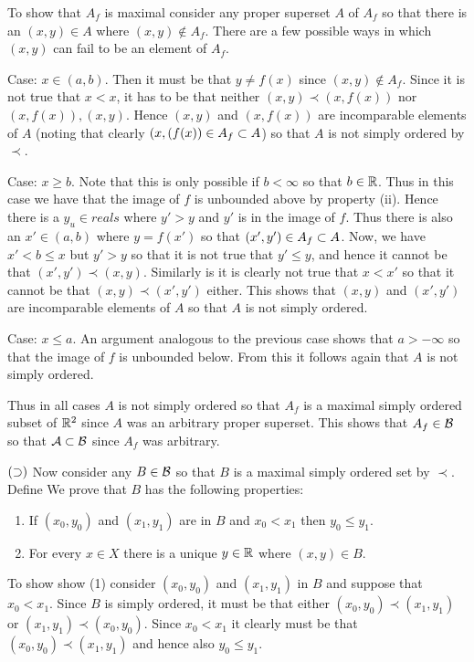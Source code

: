 {{    To show that $A_f$ is maximal consider any proper superset $A$ of $A_f$ so that there is an $(x,y) \in A$ where $(x,y) \notin A_f$.
    There are a few possible ways in which $(x,y)$ can fail to be an element of $A_f$.

    Case: $x \in (a,b)$.
    Then it must be that $y \neq f(x)$ since $(x,y) \notin A_f$.
    Since it is not true that $x < x$, it has to be that neither $(x,y) \prec (x,f(x))$ nor $(x,f(x)), (x,y)$.
    Hence $(x,y)$ and $(x,f(x))$ are incomparable elements of $A$ (noting that clearly $(x,(f(x)) \in A_f \ss A$) so that $A$ is not simply ordered by $\prec$.

    Case: $x \geq b$.
    Note that this is only possible if $b < \infty$ so that $b \in \reals$.
    Thus in this case we have that the image of $f$ is unbounded above by property (ii).
    Hence there is a $y_u \in reals$ where $y' > y$ and $y'$ is in the image of $f$.
    Thus there is also an $x' \in (a,b)$ where $y = f(x')$ so that $(x',y') \in A_f \ss A$.
    Now, we have $x' < b \leq x$ but $y' > y$ so that it is not true that $y' \leq y$, and hence it cannot be that $(x',y') \prec (x,y)$.
    Similarly is it is clearly not true that $x < x'$ so that it cannot be that $(x,y) \prec (x',y')$ either.
    This shows that $(x,y)$ and $(x',y')$ are incomparable elements of $A$ so that $A$ is not simply ordered.

    Case: $x \leq a$.
    An argument analogous to the previous case shows that $a > -\infty$ so that the image of $f$ is unbounded below.
    From this it follows again that $A$ is not simply ordered.

    Thus in all cases $A$ is not simply ordered so that $A_f$ is a maximal simply ordered subset of $\reals^2$ since $A$ was an arbitrary proper superset.
    This shows that $A_f \in \cB$ so that $\cA \ss \cB$ since $A_f$ was arbitrary.

    $(\sps)$ Now consider any $B \in \cB$ so that $B$ is a maximal simply ordered set by $\prec$.
    Define
    We prove that $B$ has the following properties:
    \begin{enumerate}[label=(\arabic*)]
    \item If $(x_0,y_0)$ and $(x_1,y_1)$ are in $B$ and $x_0 < x_1$ then $y_0 \leq y_1$.
    \item For every $x \in X$ there is a unique $y \in \reals$ where $(x,y) \in B$.
    \end{enumerate}
    To show show (1) consider $(x_0,y_0)$ and $(x_1,y_1)$ in $B$ and suppose that $x_0 < x_1$.
    Since $B$ is simply ordered, it must be that either $(x_0,y_0) \prec (x_1,y_1)$ or $(x_1,y_1) \prec (x_0,y_0)$.
    Since $x_0 < x_1$ it clearly must be that $(x_0,y_0) \prec (x_1,y_1)$ and hence also $y_0 \leq y_1$.

}}
